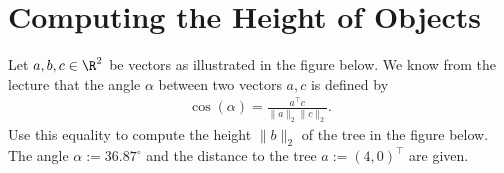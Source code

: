 \section{Computing the Height of Objects}

Let $a,b,c \in \R^2$ be vectors as illustrated in the figure below. We know from the lecture that the angle $\alpha$ between two vectors $a,c$ is defined by
\begin{align*}
\cos(\alpha) = \frac{a^\top c}{\| a\|_2 \|c \|_2}.
\end{align*}
Use this equality to compute the height $\| b \|_2$ of the tree in the figure below. The angle $\alpha := 36.87^{\circ}$ and the distance to the tree $ a := (4, 0)^\top$ are given.

